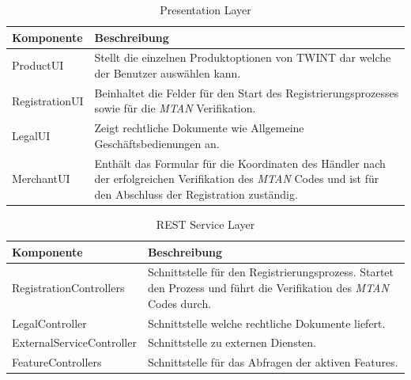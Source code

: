 \begin{table}[H]
	\centering
	\caption{Presentation Layer}
	\begin{tabular}{ | p{4.5cm} | p{10.5cm} | }
		\toprule
		{\textbf{Komponente}} & {\textbf{Beschreibung}} \\
		\midrule
		ProductUI &  Stellt die einzelnen Produktoptionen von TWINT dar welche der Benutzer auswählen kann.\\ \hline
		RegistrationUI  &  Beinhaltet die Felder für den Start des Registrierungsprozesses sowie für die \textit{\gls{MTAN}} Verifikation.\\ \hline
		LegalUI &  Zeigt rechtliche Dokumente wie Allgemeine Geschäftsbedienungen an.\\ \hline
		MerchantUI & Enthält das Formular für die Koordinaten des Händler nach der erfolgreichen Verifikation des \textit{\gls{MTAN}} Codes und ist für den Abschluss der Registration zuständig.\\
		\bottomrule
	\end{tabular}
\end{table}

\begin{table}[H]
	\centering
	\caption{REST Service Layer}
	\begin{tabular}{ | p{4.5cm} | p{10.5cm} | }
		\toprule
		{\textbf{Komponente}} & {\textbf{Beschreibung}} \\
		\midrule
		RegistrationControllers &  Schnittstelle für den Registrierungsprozess. Startet den Prozess und führt die Verifikation des \textit{\gls{MTAN}} Codes durch.\\ \hline
		LegalController &  Schnittstelle welche rechtliche Dokumente liefert. \\ \hline
		ExternalServiceController &  Schnittstelle zu externen Diensten. \\ \hline
		FeatureControllers & Schnittstelle für das Abfragen der aktiven Features. \\
		\bottomrule
	\end{tabular}
\end{table}

